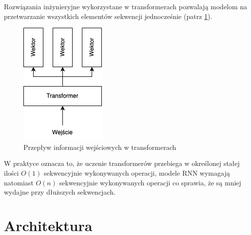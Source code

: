 \documentclass[12pt,a4paper,twoside]{book} %
\begin{document}
\pagebreak

Rozwiązania inżynieryjne wykorzystane w transformerach pozwalają modelom na przetwarzanie wszystkich elementów sekwencji jednocześnie (patrz \ref{fig:transformer_schema}).

\begin{figure}[h]
    \centering
	\includegraphics[scale=0.75]{figs/transformer.png}
	\caption{Przepływ informacji wejściowych w transformerach}
	\label{fig:transformer_schema}
\end{figure}

W praktyce oznacza to, że uczenie transformerów przebiega w określonej stałej ilości $O(1)$ sekwencyjnie wykonywanych operacji, modele RNN wymagają natomiast $O(n)$ sekwencyjnie wykonywanych operacji co sprawia, że są mniej wydajne przy dłuższych sekwencjach.

\pagebreak

\section{Architektura}
\end{document}
